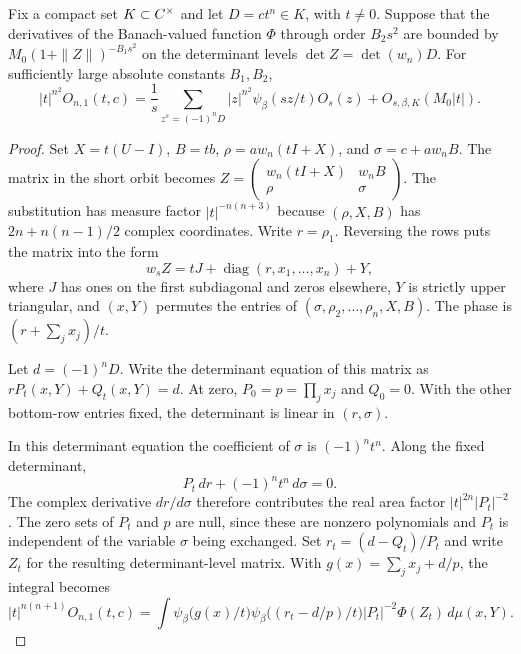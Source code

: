 \begin{lemma}\label{lem:orbital-germ}
Fix a compact set \(K\subset C^\times\) and let \(D=ct^n\in K\),
with \(t\ne0\). Suppose that the derivatives of the Banach-valued
function \(\Phi\) through order \(B_2 s^2\) are bounded by
\(M_0(1+\|Z\|)^{-B_1s^2}\) on the determinant levels
\(\det Z=\det(w_n)D\). For sufficiently large absolute constants
\(B_1,B_2\),
\begin{equation}\label{eq:orbital-germ}
 |t|^{n^2}O_{n,1}(t,c)=
 \frac{1}{s}\sum_{z^s=(-1)^n D}
 |z|^{n^2}\psi_\beta(sz/t)O_s(z)+O_{s,\beta,K}(M_0|t|).
\end{equation}
\end{lemma}

\begin{proof}
Set \(X=t(U-I)\), \(B=tb\), \(\rho=a w_n(tI+X)\), and
\(\sigma=c+a w_nB\). The matrix in the short orbit becomes
\(Z=\left(\begin{smallmatrix}w_n(tI+X)&w_nB\\\rho&\sigma\end{smallmatrix}\right)\).
The substitution has measure factor \(|t|^{-n(n+3)}\) because
\((\rho,X,B)\) has \(2n+n(n-1)/2\) complex coordinates. Write
\(r=\rho_1\). Reversing the rows puts the matrix into the form
\[
 w_s Z=tJ+\operatorname{diag}(r,x_1,\ldots,x_n)+Y,
\]
where \(J\) has ones on the first subdiagonal and zeros elsewhere,
\(Y\) is strictly upper triangular, and \((x,Y)\) permutes the
entries of \((\sigma,\rho_2,\ldots,\rho_n,X,B)\). The phase is
\((r+\sum_j x_j)/t\).

Let \(d=(-1)^nD\). Write the determinant equation of this matrix
as \(rP_t(x,Y)+Q_t(x,Y)=d\). At zero, \(P_0=p=\prod_j x_j\)
and \(Q_0=0\). With the other bottom-row entries fixed, the determinant
is linear in \((r,\sigma)\).

In this determinant equation the
coefficient of \(\sigma\) is \((-1)^n t^n\). Along the fixed determinant,
\[
 P_t\,dr+(-1)^n t^n\,d\sigma=0.
\]
The complex derivative \(dr/d\sigma\) therefore contributes
the real area factor \(|t|^{2n}|P_t|^{-2}\). The zero sets of \(P_t\) and \(p\) are
null, since these are nonzero polynomials and \(P_t\) is independent
of the variable \(\sigma\) being exchanged. Set \(r_t=(d-Q_t)/P_t\)
and write \(Z_t\) for the resulting determinant-level matrix. With
\(g(x)=\sum_j x_j+d/p\), the integral becomes
\begin{equation}\label{eq:orbital-reduced}
 |t|^{n(n+1)}O_{n,1}(t,c)
 =\int\psi_\beta\bigl(g(x)/t\bigr)
 \psi_\beta\bigl((r_t-d/p)/t\bigr)|P_t|^{-2}\Phi(Z_t)
 \,d\mu(x,Y).
\end{equation}


\end{proof}
